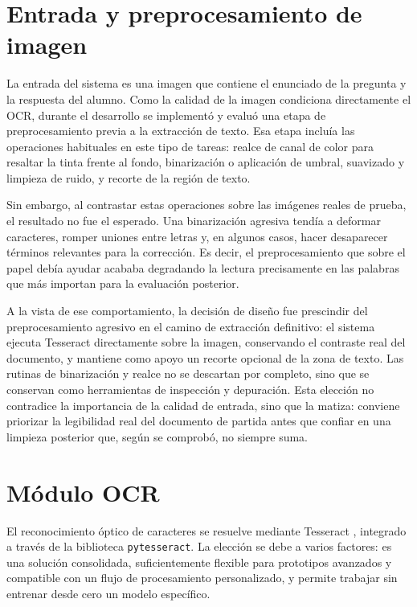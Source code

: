 \section{Entrada y preprocesamiento de imagen}

La entrada del sistema es una imagen que contiene el enunciado de la pregunta y la respuesta del alumno. Como la calidad de la imagen condiciona directamente el OCR, durante el desarrollo se implementó y evaluó una etapa de preprocesamiento previa a la extracción de texto. Esa etapa incluía las operaciones habituales en este tipo de tareas: realce de canal de color para resaltar la tinta frente al fondo, binarización o aplicación de umbral, suavizado y limpieza de ruido, y recorte de la región de texto.

Sin embargo, al contrastar estas operaciones sobre las imágenes reales de prueba, el resultado no fue el esperado. Una binarización agresiva tendía a deformar caracteres, romper uniones entre letras y, en algunos casos, hacer desaparecer términos relevantes para la corrección. Es decir, el preprocesamiento que sobre el papel debía ayudar acababa degradando la lectura precisamente en las palabras que más importan para la evaluación posterior.

A la vista de ese comportamiento, la decisión de diseño fue prescindir del preprocesamiento agresivo en el camino de extracción definitivo: el sistema ejecuta Tesseract directamente sobre la imagen, conservando el contraste real del documento, y mantiene como apoyo un recorte opcional de la zona de texto. Las rutinas de binarización y realce no se descartan por completo, sino que se conservan como herramientas de inspección y depuración. Esta elección no contradice la importancia de la calidad de entrada, sino que la matiza: conviene priorizar la legibilidad real del documento de partida antes que confiar en una limpieza posterior que, según se comprobó, no siempre suma.

\section{Módulo OCR}

El reconocimiento óptico de caracteres se resuelve mediante Tesseract \parencite{smith2007}, integrado a través de la biblioteca \texttt{pytesseract}. La elección se debe a varios factores: es una solución consolidada, suficientemente flexible para prototipos avanzados y compatible con un flujo de procesamiento personalizado, y permite trabajar sin entrenar desde cero un modelo específico.

